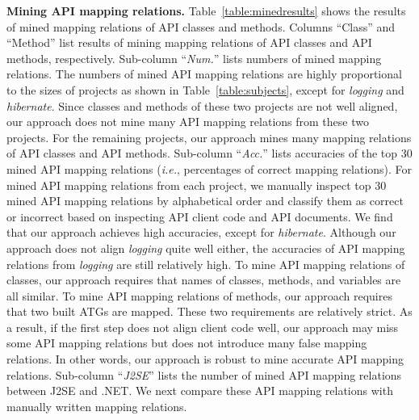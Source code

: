 \textbf{Mining API mapping relations.}
Table~\ref{table:minedresults} shows the results of mined mapping
relations of API classes and methods. Columns ``Class'' and ``Method''
list results of mining mapping relations of API classes and API methods, respectively. Sub-column
``\emph{Num.}'' lists numbers of mined mapping relations. The
numbers of mined API mapping relations are highly proportional to the sizes
of projects as shown in Table~\ref{table:subjects}, except for
\emph{logging} and \emph{hibernate}. Since classes and methods of these
two projects are not well aligned, our approach does not mine
many API mapping relations from these two projects. For the
remaining projects, our approach mines many mapping relations of API
classes and API methods. Sub-column ``\emph{Acc.}'' lists accuracies
of the top 30 mined API mapping relations (\emph{i.e.}, percentages of correct
mapping relations). For mined API mapping relations from each project, we
manually inspect top 30 mined API mapping relations by alphabetical order and classify
them as correct or incorrect based on inspecting API client code and
API documents. We find that our approach achieves high accuracies, except for
\emph{hibernate}. Although our approach does not align
\emph{logging} quite well either, the accuracies of API mapping relations from
\emph{logging} are still relatively high. To mine API mapping relations of
classes, our approach requires that names of classes, methods, and
variables are all similar. To mine API mapping relations of methods, our
approach requires that two built ATGs are
mapped. These two requirements are relatively strict. As a result, if
the first step does not align client code well, our approach may
miss some API mapping relations but does not introduce many
false mapping relations. In other words, our approach is robust to
mine accurate API mapping relations. Sub-column ``\emph{J2SE}'' lists the number of mined
API mapping relations between J2SE and .NET. We next compare these API mapping
relations with manually written mapping relations.

